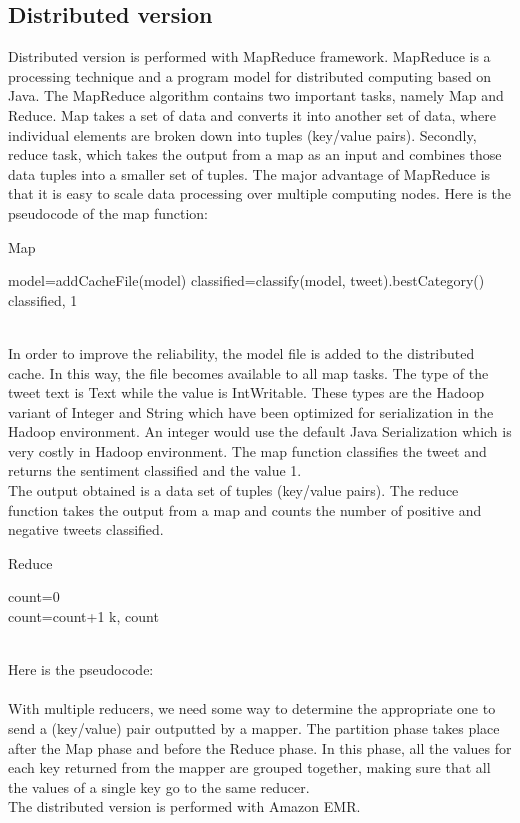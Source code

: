 \documentclass[10pt,twocolumn,letterpaper]{article}
\begin{document}
\subsection{Distributed version}
Distributed version is performed with MapReduce framework. MapReduce is a processing technique and a program model for distributed computing based on Java. The MapReduce algorithm contains two important tasks, namely Map and Reduce.  Map takes a set of data and converts it into another set of data, where individual elements are broken down into tuples (key/value pairs). Secondly, reduce task, which takes the output from a map as an input and combines those data tuples into a smaller set of tuples. The major advantage of MapReduce is that it is easy to scale data processing over multiple computing nodes. Here is the pseudocode of the map function:\\
\begin{algorithm}
\label{Map}
\caption{Map}
\begin{algorithmic}
\State model=addCacheFile(model)
\State classified=classify(model, tweet).bestCategory()
\State \Return classified, 1
\end{algorithmic}
\end{algorithm} \\
In order to improve the reliability, the model file is added to the distributed cache. In this way, the file becomes available to all map tasks. The type of the tweet text is Text while the value is IntWritable. These types are the Hadoop variant of Integer and String which have been optimized for serialization in the Hadoop environment. An integer would use the default Java Serialization which is very costly in Hadoop environment. The map function classifies the tweet and returns the sentiment classified and the value 1.\\
The output obtained is a data set of tuples (key/value pairs). The reduce function takes the output from a map and counts the number of positive and negative tweets classified.
\begin{algorithm}
\label{Reduce}
\caption{Reduce}
\begin{algorithmic}
\State count=0
    	 \do \\
		\State count=count+1
	\EndFor 
\State \Return k, count
\end{algorithmic}
\end{algorithm} \\
Here is the pseudocode:\\ \\
With multiple reducers, we need some way to determine the appropriate one to send a (key/value) pair outputted by a mapper. The partition phase takes place after the Map phase and before the Reduce phase. In this phase, all the values for each key returned from the mapper are grouped together, making sure that all the values of a single key go to the same reducer.
\\The distributed version is performed with Amazon EMR.
\end{document}
